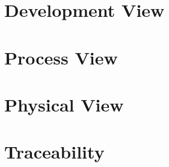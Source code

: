 \documentclass[
    english, %
]{VUMIFPSkursinis}
\begin{document}
\section{Development View}

\section{Process View}

\section{Physical View}

\section{Traceability}

\listoffigures
\printbibliography[heading=bibintoc]
\end{document}
